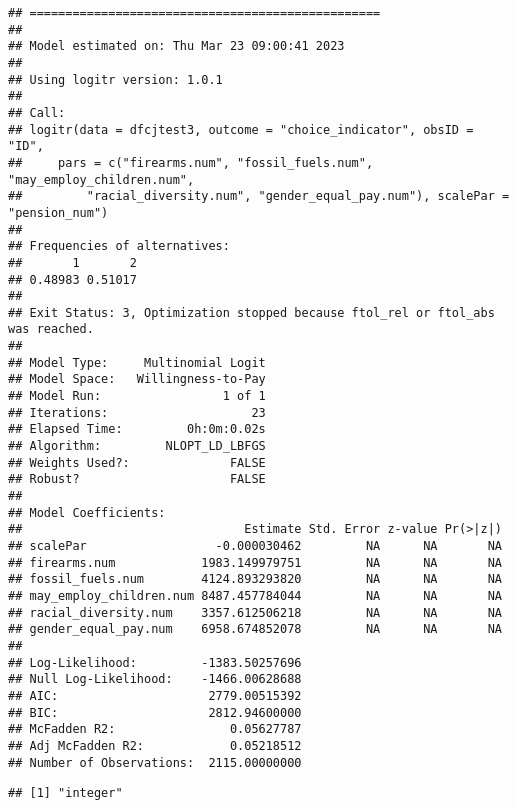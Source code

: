 \documentclass[
]{article}
\newenvironment{Shaded}{\begin{snugshade}}{\end{snugshade}}
\newcommand{\FunctionTok}[1]{\textcolor[rgb]{0.00,0.00,0.00}{#1}}
\newcommand{\NormalTok}[1]{#1}
\newcommand{\OtherTok}[1]{\textcolor[rgb]{0.56,0.35,0.01}{#1}}
\newcommand{\SpecialCharTok}[1]{\textcolor[rgb]{0.00,0.00,0.00}{#1}}
\begin{document}
\begin{verbatim}
## =================================================
## 
## Model estimated on: Thu Mar 23 09:00:41 2023 
## 
## Using logitr version: 1.0.1 
## 
## Call:
## logitr(data = dfcjtest3, outcome = "choice_indicator", obsID = "ID", 
##     pars = c("firearms.num", "fossil_fuels.num", "may_employ_children.num", 
##         "racial_diversity.num", "gender_equal_pay.num"), scalePar = "pension_num")
## 
## Frequencies of alternatives:
##       1       2 
## 0.48983 0.51017 
## 
## Exit Status: 3, Optimization stopped because ftol_rel or ftol_abs was reached.
##                                  
## Model Type:     Multinomial Logit
## Model Space:   Willingness-to-Pay
## Model Run:                 1 of 1
## Iterations:                    23
## Elapsed Time:         0h:0m:0.02s
## Algorithm:         NLOPT_LD_LBFGS
## Weights Used?:              FALSE
## Robust?                     FALSE
## 
## Model Coefficients: 
##                               Estimate Std. Error z-value Pr(>|z|)
## scalePar                  -0.000030462         NA      NA       NA
## firearms.num            1983.149979751         NA      NA       NA
## fossil_fuels.num        4124.893293820         NA      NA       NA
## may_employ_children.num 8487.457784044         NA      NA       NA
## racial_diversity.num    3357.612506218         NA      NA       NA
## gender_equal_pay.num    6958.674852078         NA      NA       NA
##                                       
## Log-Likelihood:         -1383.50257696
## Null Log-Likelihood:    -1466.00628688
## AIC:                     2779.00515392
## BIC:                     2812.94600000
## McFadden R2:                0.05627787
## Adj McFadden R2:            0.05218512
## Number of Observations:  2115.00000000
\end{verbatim}

\begin{Shaded}
\end{Shaded}

\begin{verbatim}
## [1] "integer"
\end{verbatim}

\begin{Shaded}
\end{Shaded}
\end{document}
